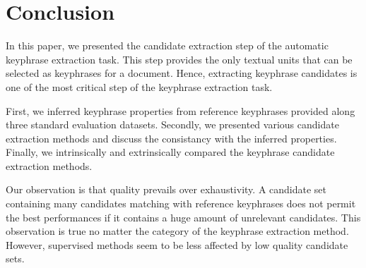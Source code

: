 
\section{Conclusion}
\label{sec:conclusion}
  In this paper, we presented the candidate extraction step of the automatic
  keyphrase extraction task. This step provides the only textual units that can
  be selected as keyphrases for a document. Hence, extracting keyphrase
  candidates is one of the most critical step of the keyphrase extraction task.
  
  First, we inferred keyphrase properties from reference keyphrases provided
  along three standard evaluation datasets. Secondly, we presented various
  candidate extraction methods and discuss the consistancy with the inferred
  properties. Finally, we intrinsically and extrinsically compared the keyphrase
  candidate extraction methods.

  Our observation is that quality prevails over exhaustivity. A candidate set
  containing many candidates matching with reference keyphrases does not permit
  the best performances if it contains a huge amount of unrelevant candidates.
  This observation is true no matter the category of the keyphrase extraction
  method. However, supervised methods seem to be less affected by low quality
  candidate sets.
